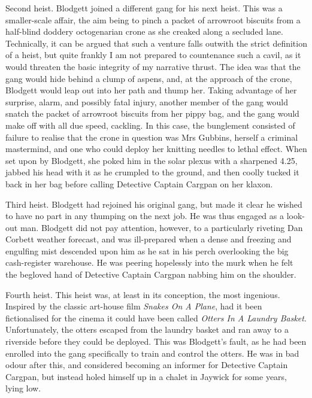 Second heist. Blodgett joined a different gang for his next heist. This was a smaller-scale affair, the aim being to pinch a packet of arrowroot biscuits from a half-blind doddery octogenarian crone as she creaked along a secluded lane. Technically, it can be argued that such a venture falls outwith the strict definition of a heist, but quite frankly I am not prepared to countenance such a cavil, as it would threaten the basic integrity of my narrative thrust. The idea was that the gang would hide behind a clump of aspens, and, at the approach of the crone, Blodgett would leap out into her path and thump her. Taking advantage of her surprise, alarm, and possibly fatal injury, another member of the gang would snatch the packet of arrowroot biscuits from her pippy bag, and the gang would make off with all due speed, cackling. In this case, the bunglement consisted of failure to realise that the crone in question was Mrs Gubbins, herself a criminal mastermind, and one who could deploy her knitting needles to lethal effect. When set upon by Blodgett, she poked him in the solar plexus with a sharpened 4.25, jabbed his head with it as he crumpled to the ground, and then coolly tucked it back in her bag before calling Detective Captain Cargpan on her klaxon.

Third heist. Blodgett had rejoined his original gang, but made it clear he wished to have no part in any thumping on the next job. He was thus engaged as a look-out man. Blodgett did not pay attention, however, to a particularly riveting Dan Corbett weather forecast, and was ill-prepared when a dense and freezing and engulfing mist descended upon him as he sat in his perch overlooking the big cash-register warehouse. He was peering hopelessly into the murk when he felt the begloved hand of Detective Captain Cargpan nabbing him on the shoulder.

Fourth heist. This heist was, at least in its conception, the most ingenious. Inspired by the classic art-house film \emph{Snakes On A Plane}, had it been fictionalised for the cinema it could have been called \emph{Otters In A Laundry Basket}. Unfortunately, the otters escaped from the laundry basket and ran away to a riverside before they could be deployed. This was Blodgett's fault, as he had been enrolled into the gang specifically to train and control the otters. He was in bad odour after this, and considered becoming an informer for Detective Captain Cargpan, but instead holed himself up in a chalet in Jaywick for some years, lying low.


